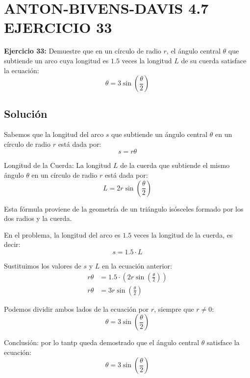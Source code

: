 \chapter*{ANTON-BIVENS-DAVIS 4.7 EJERCICIO 33}

\textbf{Ejercicio 33:} Demuestre que en un círculo de radio \( r \), el ángulo central \( \theta \) que
subtiende un arco cuya longitud es \( 1.5 \) veces la longitud \( L \) de
su cuerda satisface la ecuación:
\[
\theta = 3 \sin\left(\frac{\theta}{2}\right)
\]



\section*{Solución}

Sabemos que la longitud del arco \( s \) que subtiende un ángulo central \( \theta \) en un círculo de radio \( r \) está dada por:
   \begin{equation}
       s = r \theta
   \end{equation}

 Longitud de la Cuerda: La longitud \( L \) de la cuerda que subtiende el mismo ángulo \( \theta \) en un círculo de radio \( r \) está dada por:
   \begin{equation}
       L = 2r \sin\left(\frac{\theta}{2}\right)
   \end{equation}

   Esta fórmula proviene de la geometría de un triángulo isósceles formado por los dos radios y la cuerda.

En el problema, la longitud del arco es \( 1.5 \) veces la longitud de la cuerda, es decir:
   \begin{equation}
       s = 1.5 \cdot L
   \end{equation}

Sustituimos los valores de \( s \) y \( L \) en la ecuación anterior:
   \begin{align}
       r \theta &= 1.5 \cdot \left( 2r \sin\left(\frac{\theta}{2}\right) \right) \\
       r \theta &= 3r \sin\left(\frac{\theta}{2}\right)
   \end{align}

 Podemos dividir ambos lados de la ecuación por \( r \), siempre que \( r \neq 0 \):
   \begin{equation}
       \theta = 3 \sin\left(\frac{\theta}{2}\right)
   \end{equation}

 Conclusión: por lo tantp queda demostrado que el ángulo central \( \theta \) satisface la ecuación:
   \[
   \theta = 3 \sin\left(\frac{\theta}{2}\right)
   \]
    
